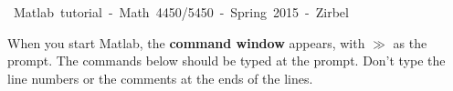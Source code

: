 \renewcommand{\baselinestretch}{1.1}


\begin{center} \mbox{\sc
Matlab tutorial - Math 4450/5450 - Spring 2015 - Zirbel}\\
\end{center}

\renewcommand{\blist}[1]{\begin{list}{{\arabic{enumi}:}}{\usecounter{enumi}\setlength{\itemsep}{#1}}}
\renewcommand{\elist}{\end{list}}

When you start Matlab, the {\bf command window} appears, with $\gg$ as the prompt.
The commands below should be typed at the prompt.
Don't type the line numbers or the comments at the ends of the lines.

